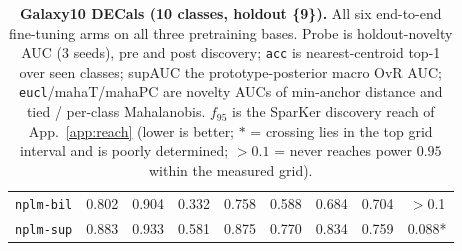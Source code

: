 \documentclass{article}
\begin{document}
\begin{table}[p]
\begin{tabular}{lcccccccc}
\texttt{nplm-bil} & 0.802 & 0.904 & 0.332 & 0.758 & 0.588 & 0.684 & 0.704 & $>$0.1 \\
\texttt{nplm-sup} & 0.883 & 0.933 & 0.581 & 0.875 & 0.770 & 0.834 & 0.759 & 0.088* \\
\bottomrule
\end{tabular}
\caption{\textbf{Galaxy10 DECals (10 classes, holdout \{9\}).} All six end-to-end fine-tuning arms on all three
pretraining bases. Probe is holdout-novelty AUC (3 seeds), pre and post
discovery; \texttt{acc} is nearest-centroid top-1 over seen classes; supAUC the
prototype-posterior macro OvR AUC; \texttt{eucl}/mahaT/mahaPC are novelty AUCs
of min-anchor distance and tied / per-class Mahalanobis. $f_{95}$ is the
SparKer discovery reach of App.~\ref{app:reach} (lower is better;
$*$ = crossing lies in the top grid interval and is poorly determined;
$>0.1$ = never reaches power $0.95$ within the measured grid).}
\label{tab:full-galaxy10}
\end{table}
\end{document}
